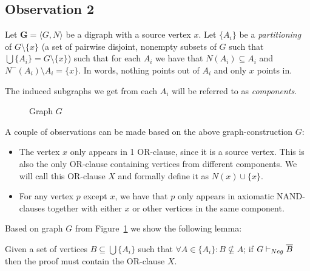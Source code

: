 \subsection{Observation 2}
\label{sub:Observation 2}
Let $\mathbf{G} = \langle G,N \rangle$ be a digraph with a source vertex $x$.
Let $\{A_i\}$ be a \textit{partitioning} of $G \setminus \{ x \}$ (a set of pairwise disjoint, nonempty subsets of $G$ such that $\bigcup \{A_i\} = G \setminus \{ x \}$) such that for each $A_i$ we have that $N(A_i) \subseteq A_i$ and $N^-(A_i) \setminus A_i = \{ x \}$.
In words, nothing points out of $A_i$ and only $x$ points in.

The induced subgraphs we get from each $A_i$ will be referred to as \textit{components}.\par
\begin{figure}[!h]
  \centering
  \caption{Graph $G$}
  \label{fig:components_link}
\end{figure}
A couple of observations can be made based on the above graph-construction $G$:
\begin{itemize}
  \item The vertex $x$ only appears in 1 OR-clause, since it is a source vertex.
  This is also the only OR-clause containing vertices from different components.
  We will call this OR-clause $X$ and formally define it as $N(x) \cup \{ x\}$.
  \item For any vertex $p$ except $x$, we have that $p$ only appears in axiomatic NAND-clauses together with either $x$ or other vertices in the same component.
\end{itemize}
Based on graph $G$ from Figure~\ref{fig:components_link} we show the following lemma:
\begin{lemma}
  Given a set of vertices $B \subseteq \bigcup \{ A_i \}$ such that $\forall A \in \{A_i\}: B \not\subseteq A$;
  if $G \vdash_{Neg} \ol{B}$ then the proof must contain the OR-clause $X$.
  \label{thm:or_clause_lemma}
\end{lemma}

